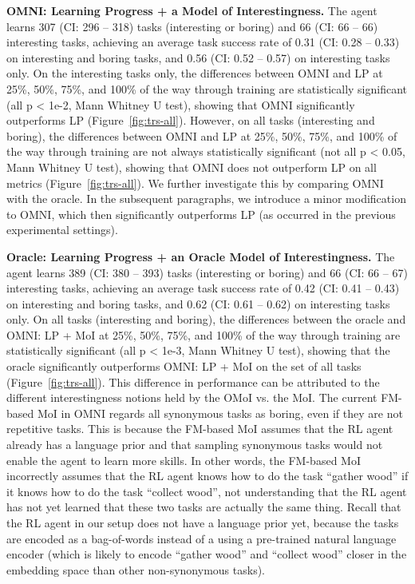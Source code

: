 \documentclass{article} %
\begin{document}
\textbf{OMNI: Learning Progress + a Model of Interestingness.} The agent learns 307 (CI: 296 -- 318) tasks (interesting or boring) and 66 (CI: 66 -- 66) interesting tasks, achieving an average task success rate of 0.31 (CI: 0.28 -- 0.33) on interesting and boring tasks, and 0.56 (CI: 0.52 -- 0.57) on interesting tasks only. On the interesting tasks only, the differences between OMNI and LP at 25\%, 50\%, 75\%, and 100\% of the way through training are statistically significant (all p < 1e-2, Mann Whitney U test), showing that OMNI significantly outperforms LP (Figure~\ref{fig:trs-all}). However, on all tasks (interesting and boring), the differences between OMNI and LP at 25\%, 50\%, 75\%, and 100\% of the way through training are not always statistically significant (not all p < 0.05, Mann Whitney U test), showing that OMNI does not outperform LP on all metrics (Figure~\ref{fig:trs-all}). We further investigate this by comparing OMNI with the oracle. In the subsequent paragraphs, we introduce a minor modification to OMNI, which then significantly outperforms LP (as occurred in the previous experimental settings).

\textbf{Oracle: Learning Progress + an Oracle Model of Interestingness.} The agent learns 389 (CI: 380 -- 393) tasks (interesting or boring) and 66 (CI: 66 -- 67) interesting tasks, achieving an average task success rate of 0.42 (CI: 0.41 -- 0.43) on interesting and boring tasks, and 0.62 (CI: 0.61 -- 0.62) on interesting tasks only. On all tasks (interesting and boring), the differences between the oracle and OMNI: LP + MoI at 25\%, 50\%, 75\%, and 100\% of the way through training are statistically significant (all p < 1e-3, Mann Whitney U test), showing that the oracle significantly outperforms OMNI: LP + MoI on the set of all tasks (Figure~\ref{fig:trs-all}). This difference in performance can be attributed to the different interestingness notions held by the OMoI vs. the MoI. The current FM-based MoI in OMNI regards all synonymous tasks as boring, even if they are not repetitive tasks. This is because the FM-based MoI assumes that the RL agent already has a language prior and that sampling synonymous tasks would not enable the agent to learn more skills. In other words, the FM-based MoI incorrectly assumes that the RL agent knows how to do the task ``gather wood'' if it knows how to do the task ``collect wood'', not understanding that the RL agent has not yet learned that these two tasks are actually the same thing. Recall that the RL agent in our setup does not have a language prior yet, because the tasks are encoded as a bag-of-words instead of a using a pre-trained natural language encoder (which is likely to encode ``gather wood'' and ``collect wood'' closer in the embedding space than other non-synonymous tasks).
\end{document}
